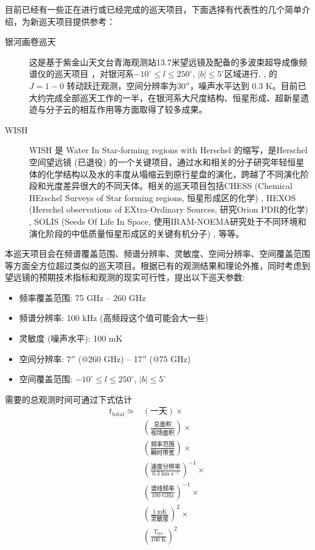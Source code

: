 \documentclass[a4paper]{article}
\begin{document}
目前已经有一些正在进行或已经完成的巡天项目，下面选择有代表性的几个简单介绍，为新巡天项目提供参考：
\begin{description}
  \item[银河画卷巡天] 这是基于紫金山天文台青海观测站13.7米望远镜及配备的多波束超导成像频谱仪的巡天项目 \citep{Lu2018}，对银河系$-10^\circ\le l\le 250^\circ$, $|b|\le5^\circ$区域进行, , 的 $J=1{-}0$ 转动跃迁观测，空间分辨率为$30''$，噪声水平达到 0.3 K。目前已大约完成全部巡天工作的一半，在银河系大尺度结构、恒星形成、超新星遗迹与分子云的相互作用等方面取得了较多成果。
  \item[WISH] WISH 是 Water In Star-forming regions with Herschel 的缩写，是Herschel空间望远镜 (已退役) 的一个关键项目，通过水和相关的分子研究年轻恒星体的化学结构以及水的丰度从塌缩云到原行星盘的演化，跨越了不同演化阶段和光度差异很大的不同天体。相关的巡天项目包括CHESS (Chemical HErschel Surveys of Star forming regions, 恒星形成区的化学) \citep{Ceccarelli2010}, HEXOS (Herschel observations of EXtra-Ordinary Sources, 研究Orion PDR的化学) \citep{Bergin2010}, SOLIS (Seeds Of Life In Space, 使用IRAM-NOEMA研究处于不同环境和演化阶段的中低质量恒星形成区的关键有机分子) \citep{Ceccarelli2017}, 等等。
\end{description}  
本巡天项目会在频谱覆盖范围、频谱分辨率、灵敏度、空间分辨率、空间覆盖范围等方面全方位超过类似的巡天项目。根据已有的观测结果和理论外推，同时考虑到望远镜的预期技术指标和观测的现实可行性，提出以下巡天参数:
\begin{itemize}
  \item 频率覆盖范围: 75 GHz -- 260 GHz
  \item 频谱分辨率: 100 kHz (高频段这个值可能会大一些)
  \item 灵敏度 (噪声水平): 100 mK
  \item 空间分辨率: 7$''$ (@260 GHz) -- 17$''$ (@75 GHz)
  \item 空间覆盖范围: $-10^\circ\le l\le 250^\circ$, $|b|\le5^\circ$
\end{itemize}  
需要的总观测时间可通过下式估计
\begin{equation}
\begin{split}
  t_\text{total} \simeq
  & \left(\text{一天}\right) \times\\
  & \left(\frac{\text{总面积}}{\text{视场面积}}\right)\times \\
  & \left(\frac{\text{频率范围}}{\text{瞬时带宽}}\right)\times \\
  & \left(\frac{\text{速度分辨率}}{0.3\;\text{km}\;\text{s}^{-1}}\right)^{-1}\times \\
  & \left(\frac{\text{谱线频率}}{100\;\text{GHz}}\right)^{-1}\times \\
  & \left(\frac{1\;\text{mK}}{\text{灵敏度}}\right)^2\times \\
  & \left(\frac{T_\text{sys}}{100\;\text{K}}\right)^2
\end{split} 
\end{equation} 
\end{document}

